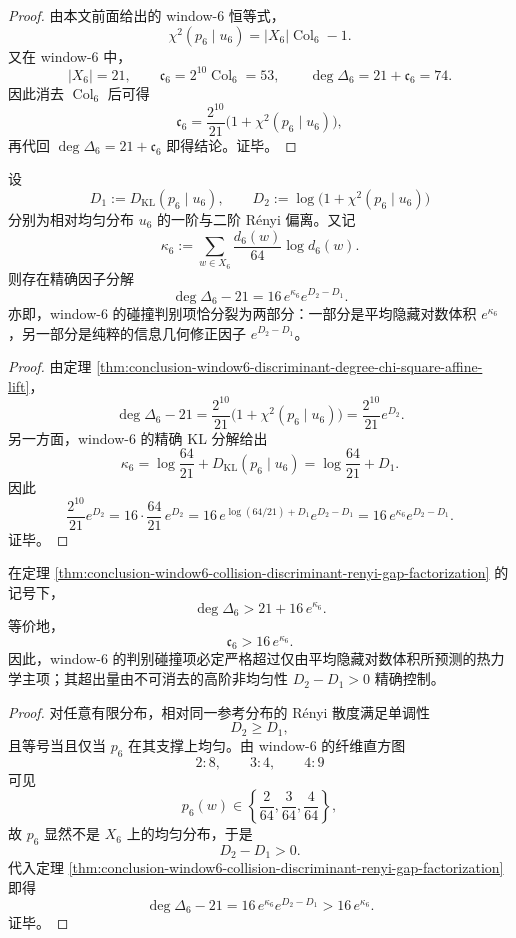 \begin{proof}
由本文前面给出的 window-\(6\) 恒等式，
\[
\chi^2(p_6\mid u_6)=|X_6|\operatorname{Col}_6-1.
\]
又在 window-\(6\) 中，
\[
|X_6|=21,
\qquad
\mathfrak c_6=2^{10}\operatorname{Col}_6=53,
\qquad
\deg\Delta_6=21+\mathfrak c_6=74.
\]
因此消去 \(\operatorname{Col}_6\) 后可得
\[
\mathfrak c_6=\frac{2^{10}}{21}\bigl(1+\chi^2(p_6\mid u_6)\bigr),
\]
再代回 \(\deg\Delta_6=21+\mathfrak c_6\) 即得结论。证毕。
\end{proof}

\begin{theorem}\label{thm:conclusion-window6-collision-discriminant-renyi-gap-factorization}
设
\[
D_1:=D_{\mathrm{KL}}(p_6\mid u_6),
\qquad
D_2:=\log\bigl(1+\chi^2(p_6\mid u_6)\bigr)
\]
分别为相对均匀分布 \(u_6\) 的一阶与二阶 R\'enyi 偏离。又记
\[
\kappa_6:=\sum_{w\in X_6}\frac{d_6(w)}{64}\log d_6(w).
\]
则存在精确因子分解
\[
\deg\Delta_6-21
=
16\,e^{\kappa_6}e^{D_2-D_1}.
\]
亦即，window-\(6\) 的碰撞判别项恰分裂为两部分：一部分是平均隐藏对数体积 \(e^{\kappa_6}\)，另一部分是纯粹的信息几何修正因子 \(e^{D_2-D_1}\)。
\end{theorem}

\begin{proof}
由定理 \ref{thm:conclusion-window6-discriminant-degree-chi-square-affine-lift}，
\[
\deg\Delta_6-21
=
\frac{2^{10}}{21}\bigl(1+\chi^2(p_6\mid u_6)\bigr)
=
\frac{2^{10}}{21}e^{D_2}.
\]
另一方面，window-\(6\) 的精确 KL 分解给出
\[
\kappa_6=\log\frac{64}{21}+D_{\mathrm{KL}}(p_6\mid u_6)
=
\log\frac{64}{21}+D_1.
\]
因此
\[
\frac{2^{10}}{21}e^{D_2}
=
16\cdot \frac{64}{21}\,e^{D_2}
=
16\,e^{\log(64/21)+D_1}e^{D_2-D_1}
=
16\,e^{\kappa_6}e^{D_2-D_1}.
\]
证毕。
\end{proof}

\begin{corollary}\label{cor:conclusion-window6-discriminant-degree-strict-exponential-lower-bound}
在定理 \ref{thm:conclusion-window6-collision-discriminant-renyi-gap-factorization} 的记号下，
\[
\deg\Delta_6>21+16\,e^{\kappa_6}.
\]
等价地，
\[
\mathfrak c_6>16\,e^{\kappa_6}.
\]
因此，window-\(6\) 的判别碰撞项必定严格超过仅由平均隐藏对数体积所预测的热力学主项；其超出量由不可消去的高阶非均匀性 \(D_2-D_1>0\) 精确控制。
\end{corollary}

\begin{proof}
对任意有限分布，相对同一参考分布的 R\'enyi 散度满足单调性
\[
D_2\ge D_1,
\]
且等号当且仅当 \(p_6\) 在其支撑上均匀。由 window-\(6\) 的纤维直方图
\[
2:8,\qquad 3:4,\qquad 4:9
\]
可见
\[
p_6(w)\in \left\{\frac{2}{64},\frac{3}{64},\frac{4}{64}\right\},
\]
故 \(p_6\) 显然不是 \(X_6\) 上的均匀分布，于是
\[
D_2-D_1>0.
\]
代入定理 \ref{thm:conclusion-window6-collision-discriminant-renyi-gap-factorization} 即得
\[
\deg\Delta_6-21
=
16\,e^{\kappa_6}e^{D_2-D_1}
>
16\,e^{\kappa_6}.
\]
证毕。
\end{proof}


